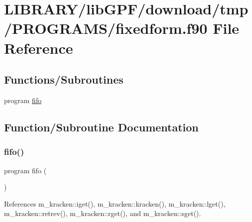 \hypertarget{fixedform_8f90}{}\section{L\+I\+B\+R\+A\+R\+Y/lib\+G\+P\+F/download/tmp/\+P\+R\+O\+G\+R\+A\+M\+S/fixedform.f90 File Reference}
\label{fixedform_8f90}
\subsection*{Functions/\+Subroutines}
\begin{DoxyCompactItemize}
\item 
program \hyperlink{fixedform_8f90_a5351077e5e35d56c018014459fac67b2}{fifo}
\end{DoxyCompactItemize}


\subsection{Function/\+Subroutine Documentation}
\mbox{\label{fixedform_8f90_a5351077e5e35d56c018014459fac67b2}} 
\subsubsection{\texorpdfstring{fifo()}{fifo()}}
{\footnotesize\ttfamily program fifo (\begin{DoxyParamCaption}{ }\end{DoxyParamCaption})}



References m\+\_\+kracken\+::iget(), m\+\_\+kracken\+::kracken(), m\+\_\+kracken\+::lget(), m\+\_\+kracken\+::retrev(), m\+\_\+kracken\+::rget(), and m\+\_\+kracken\+::sget().

